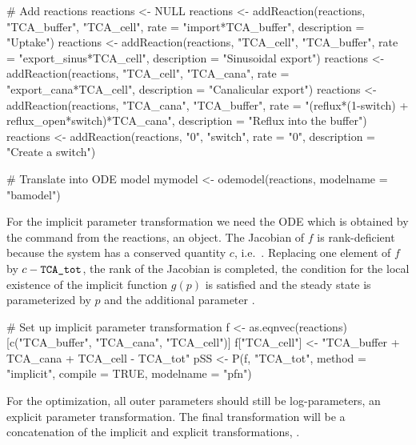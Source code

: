\documentclass[article]{jss}
\begin{document}
\begin{CodeChunk}
\begin{CodeInput}
# Add reactions
reactions <- NULL
reactions <- addReaction(reactions, "TCA_buffer", "TCA_cell",
		 rate = "import*TCA_buffer",
		 description = "Uptake")
reactions <- addReaction(reactions, "TCA_cell", "TCA_buffer",
		 rate = "export_sinus*TCA_cell",
		 description = "Sinusoidal export")
reactions <- addReaction(reactions, "TCA_cell", "TCA_cana",
		 rate = "export_cana*TCA_cell",
		 description = "Canalicular export")
reactions <- addReaction(reactions, "TCA_cana", "TCA_buffer",
		 rate = "(reflux*(1-switch) + reflux_open*switch)*TCA_cana",
		 description = "Reflux into the buffer")
reactions <- addReaction(reactions, "0", "switch",
		 rate = "0",
		 description = "Create a switch")

# Translate into ODE model
mymodel <- odemodel(reactions, modelname = "bamodel")
\end{CodeInput}
\end{CodeChunk}

For the implicit parameter transformation we need the ODE which is obtained by the  command from the reactions, an  object. The Jacobian of $f$ is rank-deficient because the system has a conserved quantity $c$, i.e.~. Replacing one element of $f$ by $c - \verb!TCA_tot!$, the rank of the Jacobian is completed, the condition for the local existence of the implicit function $g(p)$ is satisfied and the steady state is parameterized by $p$ and the additional parameter .

\begin{CodeChunk}
\begin{CodeInput}
# Set up implicit parameter transformation
f <- as.eqnvec(reactions)[c("TCA_buffer", "TCA_cana", "TCA_cell")]
f["TCA_cell"] <- "TCA_buffer + TCA_cana + TCA_cell - TCA_tot"
pSS <- P(f, "TCA_tot", method = "implicit",
         compile = TRUE, modelname = "pfn")
\end{CodeInput}
\end{CodeChunk}

For the optimization, all outer parameters should still be log-parameters, an explicit parameter transformation. The final transformation will be a concatenation of the implicit and explicit transformations, .

\begin{CodeChunk}
\end{CodeChunk}
\end{document}
